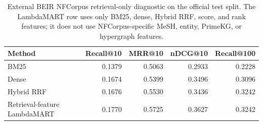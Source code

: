 \begin{table}[t]
\centering
\small
\caption{External BEIR NFCorpus retrieval-only diagnostic on the official test split. The LambdaMART row uses only BM25, dense, Hybrid RRF, score, and rank features; it does not use NFCorpus-specific MeSH, entity, PrimeKG, or hypergraph features.}
\label{tab:nfcorpus-retrieval-diagnostic}
\begin{tabular}{lrrrr}
\toprule
Method & Recall@10 & MRR@10 & nDCG@10 & Recall@100 \\
\midrule
BM25 & 0.1379 & 0.5063 & 0.2933 & 0.2228 \\
Dense & 0.1674 & 0.5399 & 0.3496 & 0.3096 \\
Hybrid RRF & 0.1676 & 0.5530 & 0.3436 & 0.3242 \\
Retrieval-feature LambdaMART & 0.1770 & 0.5725 & 0.3627 & 0.3242 \\
\bottomrule
\end{tabular}
\end{table}
